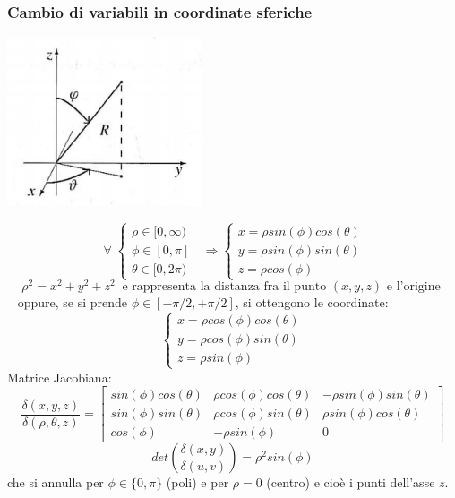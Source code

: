 \subsubsection{Cambio di variabili in coordinate sferiche}
\begin{center}
    \includegraphics[height=5cm]{../6-integrali doppi e tripli (analisi II)/img1.PNG}
\end{center}
\[
    \;\forall\; \begin{cases}
        \rho \in [0,\infty)\\
        \phi \in [0,\pi]\\
        \theta \in [0,2\pi)
    \end{cases} \;\; \Longrightarrow \begin{cases}
        x = \rho sin(\phi) cos(\theta)\\
        y = \rho sin(\phi) sin(\theta)\\
        z = \rho cos(\phi)
    \end{cases}
\]
\[
    \rho^2 = x^2 +y^2+z^2 \;\; \text{e rappresenta la distanza fra il punto $(x,y,z)$ e l'origine}\;
\]
\ \newline
oppure, se si prende $\phi \in [-\pi /2, + \pi/2]$, si ottengono le coordinate:
\[
    \begin{cases}
        x = \rho cos(\phi) cos(\theta)\\
        y = \rho cos(\phi) sin(\theta)\\
        z = \rho sin(\phi)
    \end{cases}
\]
Matrice Jacobiana:
\[
    \frac{\delta(x,y,z)}{\delta(\rho,\theta,z)} = \left[
        \begin{matrix}
            sin(\phi) cos(\theta) & \rho cos(\phi) cos(\theta) & -\rho sin(\phi) sin(\theta)\\ 
            sin(\phi) sin(\theta) & \rho cos(\phi) sin(\theta) & \rho sin(\phi) cos(\theta) \\ 
            cos(\phi) & -\rho sin(\phi) & 0
        \end{matrix}\right]
\]
\[
    det\left(\frac{\delta(x,y)}{\delta(u,v)}\right) = \rho^2 sin(\phi)
\]
che si annulla per $\phi \in \{0,\pi\}$ (poli) e per $\rho=0$ (centro) e cioè i punti dell'asse $z$.
